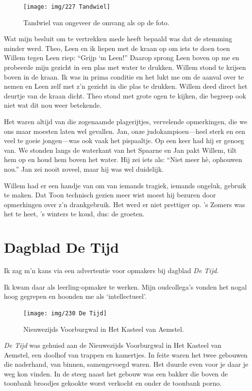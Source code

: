 \documentclass[10pt,twoside, openright]{memoir}
\begin{document}
\begin{figure}
\texttt{[image: img/227 Tandwiel]}
\caption*{\footnotesize Tandwiel van ongeveer de omvang als op de foto.}
\end{figure}

Wat mijn besluit om te vertrekken mede heeft bepaald was dat de stemming minder werd. Theo, Leen en ik liepen met de kraan op om iets te doen toen Willem tegen Leen riep: ``Grijp ‘m Leen!'' Daarop sprong Leen boven op me en probeerde mijn gezicht in een plas met water te drukken. Willem stond te krijsen boven in de kraan. Ik was in prima conditie en het lukt me om de aanval  over te nemen en Leen zelf met z’n gezicht in die plas te drukken. Willem deed direct het deurtje van de kraan dicht. Theo stond met grote ogen te kijken, die begreep ook niet wat dit nou weer betekende.

Het waren altijd van die zogenaamde plagerijtjes, vervelende opmerkingen, die we ons maar moesten laten wel gevallen. Jan, onze judokampioen---heel sterk en een veel te goeie jongen---was ook vaak het pispaaltje. Op een keer had hij er genoeg van. We stonden langs de waterkant van het Spaarne en Jan pakt Willem, tilt hem op en houd hem boven het water. Hij zei iets als: ``Niet meer hè, ophouwen nou.'' Jan zei nooit zoveel, maar hij was wel duidelijk.

Willem had er een handje van om van iemands tragiek, iemands ongeluk, gebruik te maken. Dat Toon technisch gezien meer wist moest hij bezuren door opmerkingen over z’n drankgebruik. Het werd er niet prettiger op. ’s Zomers was het te heet, ’s winters te koud, dus: de groeten.

\section{Dagblad De Tijd} %
\label{cha:detijd}

Ik zag m’n kans via een advertentie voor opmakers bij dagblad \emph{De Tijd}.

Ik kwam daar als leerling-opmaker te werken. Mijn oudcollega’s vonden het nogal hoog gegrepen en hoonden me als `intellectueel'.

\begin{figure}
\texttt{[image: img/230 De Tijd]}
\caption*{\footnotesize Nieuwezijds Voorburgwal in Het Kasteel van Aemstel.}
\end{figure}

\emph{De Tijd} was gehuisd aan de Nieuwezijds Voorburgwal in Het Kasteel van Aemstel, een doolhof van trappen en kamertjes. In feite waren het twee gebouwen die naderhand, van binnen, samengevoegd waren. Het duurde even voor je daar je weg kon vinden. In de steeg naast het gebouw was een bakker die boven de toonbank broodjes gekookte worst verkocht en onder de toonbank porno. 
\end{document}

